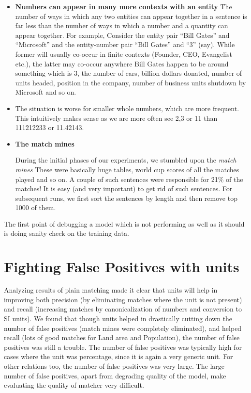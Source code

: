 \documentclass[a4paper,10pt]{article}
\begin{document}
\begin{itemize}
 \item \textbf{Numbers can appear in many more contexts with an entity}
The number of ways in which any two entities can appear together
in a sentence is far less than the number of ways in which a number and a quantity can appear
together. For example, Consider the entity pair “Bill Gates” and “Microsoft” and the entity-number
pair “Bill Gates” and “3” (say). While former will usually co-occur in finite contexts (Founder,
CEO, Evangelist etc.), the latter may co-occur anywhere Bill Gates happen to be around something
which is 3, the number of cars, billion dollars donated, number of units headed, position in the
company, number of business units shutdown by Microsoft and so on.
\item The situation is worse for smaller whole numbers, which are more frequent. This intuitively makes
sense as we are more often see 2,3 or 11 than 111212233 or 11.42143.
\item \textbf{The match mines}

During the initial phases of our experiments, we stumbled upon the \emph{match mines}
These were basically huge tables, world cup scores of all the matches played and so on.
A couple of such sentences were responsible for 21\% of the matches!
It is easy (and very important) to get rid of such sentences. For subsequent runs, we first sort the sentences by length and then remove
top 1000 of them.
\end{itemize}

The first point of debugging a model which is not performing as well as it should is doing 
sanity check on the training data. 

\section{Fighting False Positives with units}
Analyzing results of plain matching made it clear that units will help in improving both precision
(by eliminating matches where the unit is not present) and recall (increasing matches by
canonicalization of numbers and conversion to SI units). We found that though units helped in
drastically cutting down the number of false positives (match mines were completely eliminated),
and helped recall (lots of good matches for Land area and Population), the number of false positives
was still a trouble. The number of false positives was typically high for cases where the unit was
percentage, since it is again a very generic unit. For other relations too, the number of false
positives was very large. The large number of false positives, apart from degrading quality of the
model, make evaluating the quality of matcher very difficult.
\end{document}
